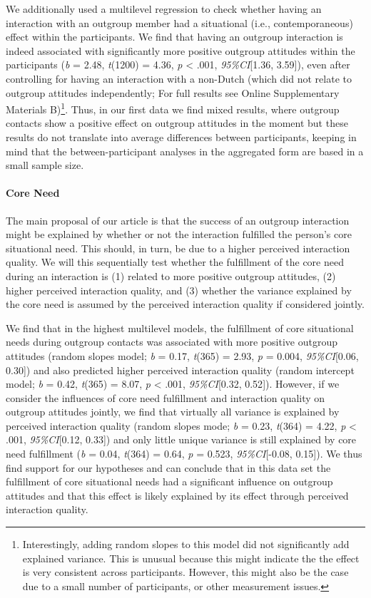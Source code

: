 We additionally used a multilevel regression to check whether having an
interaction with an outgroup member had a situational (i.e.,
contemporaneous) effect within the participants. We find that having an
outgroup interaction is indeed associated with significantly more
positive outgroup attitudes within the participants (\textit{b} = 2.48,
\textit{t}(1200) = 4.36, \textit{p} \textless{} .001,
\textit{95\%CI}{[}1.36, 3.59{]}), even after controlling for having an
interaction with a non-Dutch (which did not relate to outgroup attitudes
independently; For full results see Online Supplementary Materials
B)\footnote{Interestingly, adding random slopes to this model did not significantly add explained variance. This is unusual because this might indicate the the effect is very consistent across participants. However, this might also be the case due to a small number of participants, or other measurement issues.}.
Thus, in our first data we find mixed results, where outgroup contacts
show a positive effect on outgroup attitudes in the moment but these
results do not translate into average differences between participants,
keeping in mind that the between-participant analyses in the aggregated
form are based in a small sample size.

\paragraph{Core Need}

The main proposal of our article is that the success of an outgroup
interaction might be explained by whether or not the interaction
fulfilled the person's core situational need. This should, in turn, be
due to a higher perceived interaction quality. We will this sequentially
test whether the fulfillment of the core need during an interaction is
(1) related to more positive outgroup attitudes, (2) higher perceived
interaction quality, and (3) whether the variance explained by the core
need is assumed by the perceived interaction quality if considered
jointly.

We find that in the highest multilevel models, the fulfillment of core
situational needs during outgroup contacts was associated with more
positive outgroup attitudes (random slopes model; \textit{b} = 0.17,
\textit{t}(365) = 2.93, \textit{p} = 0.004, \textit{95\%CI}{[}0.06,
0.30{]}) and also predicted higher perceived interaction quality (random
intercept model; \textit{b} = 0.42, \textit{t}(365) = 8.07, \textit{p}
\textless{} .001, \textit{95\%CI}{[}0.32, 0.52{]}). However, if we
consider the influences of core need fulfillment and interaction quality
on outgroup attitudes jointly, we find that virtually all variance is
explained by perceived interaction quality (random slopes mode;
\textit{b} = 0.23, \textit{t}(364) = 4.22, \textit{p} \textless{} .001,
\textit{95\%CI}{[}0.12, 0.33{]}) and only little unique variance is
still explained by core need fulfillment (\textit{b} = 0.04,
\textit{t}(364) = 0.64, \textit{p} = 0.523, \textit{95\%CI}{[}-0.08,
0.15{]}). We thus find support for our hypotheses and can conclude that
in this data set the fulfillment of core situational needs had a
significant influence on outgroup attitudes and that this effect is
likely explained by its effect through perceived interaction quality.

